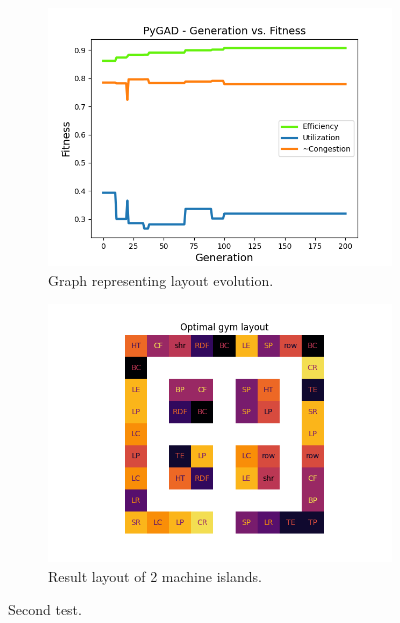 \documentclass[9pt]{pnas-new}
\begin{document}
\begin{figure}[H]
	\begin{subfigure}{0.495\linewidth}
        \centering
        \includegraphics[width=\textwidth]{2x2fitness.png}
        \caption{Graph representing layout evolution.}\label{fig:2x2fitness}
    \end{subfigure}
    \begin{subfigure}{0.495\linewidth}
        \centering
        \includegraphics[width=\textwidth]{2x2_layout.png}
        \caption{Result layout of 2 machine islands.}\label{fig:2x2_layout}
    \end{subfigure}
    \caption{Second test.}\label{fig:secondTest}
\end{figure}
\end{document}

